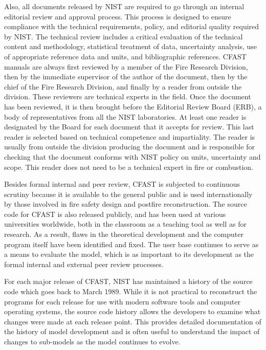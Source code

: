 Also, all documents released by NIST are required to go through an internal editorial review and approval process. This process is designed to ensure compliance with the technical requirements, policy, and editorial quality required by NIST. The technical review includes a critical evaluation of the technical content and methodology, statistical treatment of data, uncertainty analysis, use of appropriate reference data and units, and bibliographic references. CFAST manuals are always first reviewed by a member of the Fire Research Division, then by the immediate supervisor of the author of the document, then by the chief of the Fire Research Division, and finally by a reader from outside the division. These reviewers are technical experts in the field. Once the document has been reviewed, it is then brought before the Editorial Review Board (ERB), a body of representatives from all the NIST laboratories. At least one reader is designated by the Board for each document that it accepts for review. This last reader is selected based on technical competence and impartiality. The reader is usually from outside the division producing the document and is responsible for checking that the document conforms with NIST policy on units, uncertainty and scope. This reader does not need to be a technical expert in fire or combustion.

Besides formal internal and peer review, CFAST is subjected to continuous scrutiny because it is available to the general public and is used internationally by those involved in fire safety design and postfire reconstruction. The source code for CFAST is also released publicly, and has been used at various universities worldwide, both in the classroom as a teaching tool as well as for research. As a result, flaws in the theoretical development and the computer program itself have been identified and fixed. The user base continues to serve as a means to evaluate the model, which is as important to its development as the formal internal and external peer review processes.

For each major release of CFAST, NIST has maintained a history of the source code which goes back to March 1989.  While it is not practical to reconstruct the programs for each release for use with modern software tools and computer operating systems, the source code history allows the developers to examine what changes were made at each release point. This provides detailed documentation of the history of model development and is often useful to understand the impact of changes to sub-models as the model continues to evolve.




